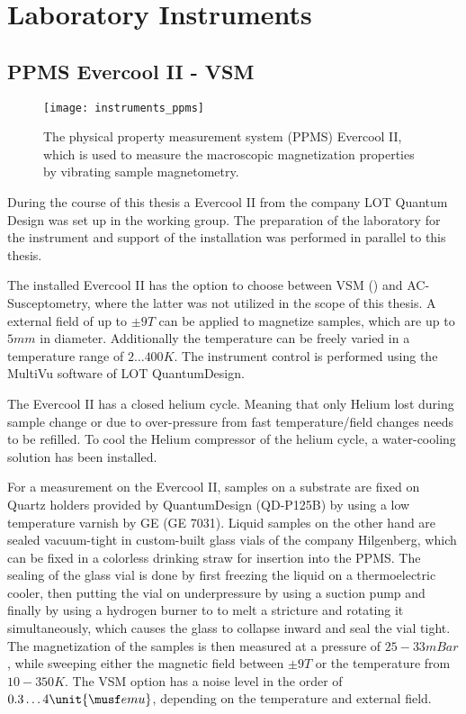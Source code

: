 \documentclass[\main/dresen_thesis.tex]{subfiles}
\begin{document}
\section{Laboratory Instruments}
  \subsection{PPMS Evercool II - VSM}
    \label{ch:instruments:laboratoryInstruments:vsm}
    \begin{figure}[ht]
      \centering
      \texttt{[image: instruments\_ppms]}
      \caption{\label{fig:appendix:instruments:ppms}The physical property measurement system (PPMS) Evercool II, which is used to measure the macroscopic magnetization properties by vibrating sample magnetometry.}
    \end{figure}
    During the course of this thesis a Evercool II from the company LOT Quantum Design was set up in the working group.
    The preparation of the laboratory for the instrument and support of the installation was performed in parallel to this thesis.

    The installed Evercool II has the option to choose between VSM () and AC-Susceptometry, where the latter was not utilized in the scope of this thesis.
    A external field of up to $\pm 9 \unit{T}$ can be applied to magnetize samples, which are up to $5 \unit{mm}$ in diameter.
    Additionally the temperature can be freely varied in a temperature range of $2 \ldots 400 \unit{K}$.
    The instrument control is performed using the MultiVu software of LOT QuantumDesign.

    The Evercool II has a closed helium cycle.
    Meaning that only Helium lost during sample change or due to over-pressure from fast temperature/field changes needs to be refilled.
    To cool the Helium compressor of the helium cycle, a water-cooling solution has been installed.

    For a measurement on the Evercool II, samples on a substrate are fixed on Quartz holders provided by QuantumDesign (QD-P125B) by using a low temperature varnish by GE (GE 7031).
    Liquid samples on the other hand are sealed vacuum-tight in custom-built glass vials of the company Hilgenberg, which can be fixed in a colorless drinking straw for insertion into the PPMS.
    The sealing of the glass vial is done by first freezing the liquid on a thermoelectric cooler, then putting the vial on underpressure by using a suction pump and finally by using a hydrogen burner to to melt a stricture and rotating it simultaneously, which causes the glass to collapse inward and seal the vial tight.
    The magnetization of the samples is then measured at a pressure of $25 - 33 \unit{mBar}$, while sweeping either the magnetic field between $\pm 9 \unit{T}$ or the temperature from $10 - 350 \unit{K}$.
    The VSM option has a noise level in the order of $0.3 \ldots 4 \unit{\musf emu}$, depending on the temperature and external field.
\end{document}
